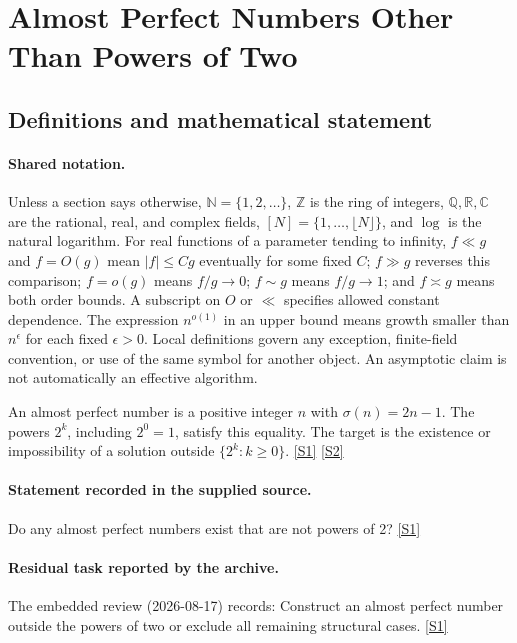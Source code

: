 \documentclass[11pt,a4paper]{article}
\newcommand{\N}{\mathbb{N}}
\newcommand{\Z}{\mathbb{Z}}
\newcommand{\Q}{\mathbb{Q}}
\newcommand{\R}{\mathbb{R}}
\newcommand{\C}{\mathbb{C}}
\newcommand{\sref}[2]{\hyperlink{source:#1:#2}{[S#2]}}
\begin{document}
\section{Almost Perfect Numbers Other Than Powers of Two}\label{statement}


\subsection{Definitions and mathematical statement}

\paragraph{Shared notation.}Unless a section says otherwise, $\N=\{1,2,\ldots\}$,
$\Z$ is the ring of integers, $\Q,\R,\C$ are the rational, real, and complex
fields, $[N]=\{1,\ldots,\lfloor N\rfloor\}$, and $\log$ is the natural
logarithm. For real functions of a parameter tending to infinity,
$f\ll g$ and $f=O(g)$ mean $|f|\leq Cg$ eventually for some fixed $C$;
$f\gg g$ reverses this comparison; $f=o(g)$ means $f/g\to0$;
$f\sim g$ means $f/g\to1$; and $f\asymp g$ means both order bounds.
A subscript on $O$ or $\ll$ specifies allowed constant dependence.
The expression $n^{o(1)}$ in an upper bound means growth smaller than
$n^\epsilon$ for each fixed $\epsilon>0$. Local definitions govern any
exception, finite-field convention, or use of the same symbol for another
object. An asymptotic claim is not automatically an effective algorithm.



An almost perfect number is a positive integer $n$ with $\sigma(n)=2n-1$. The powers $2^k$, including $2^0=1$, satisfy this equality. The target is the existence or impossibility of a solution outside $\{2^k:k\geq0\}$. \sref{statement}{1} \sref{statement}{2}

\paragraph{Statement recorded in the supplied source.}
Do any almost perfect numbers exist that are not powers of 2? \sref{statement}{1}

\paragraph{Residual task reported by the archive.}

The embedded review (2026-08-17) records: Construct an almost perfect number outside the powers of two or exclude all remaining structural cases. \sref{statement}{1}
\end{document}
